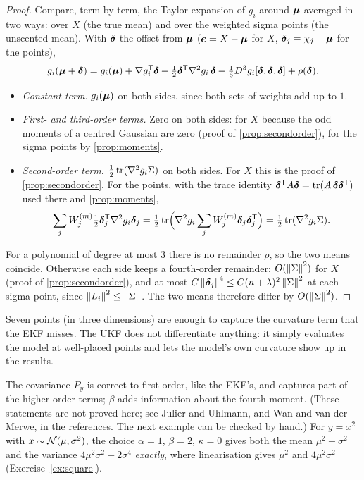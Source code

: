 \begin{proof}
Compare, term by term, the Taylor expansion of $g_i$ around $\bm{\mu}$
averaged in two ways: over $X$ (the true mean) and over the weighted
sigma points (the unscented mean). With $\bm{\delta}$ the offset from
$\bm{\mu}$ ($\bm{e}=X-\bm{\mu}$ for $X$, $\bm{\delta}_j=\chi_j-\bm{\mu}$ for the
points),
\[
  g_i(\bm{\mu}+\bm{\delta})=g_i(\bm{\mu})+\nabla g_i^{\mathsf{T}}\bm{\delta}
  +\tfrac12\bm{\delta}^{\mathsf{T}}\nabla^2g_i\,\bm{\delta}
  +\tfrac16D^3g_i[\bm{\delta},\bm{\delta},\bm{\delta}]+\rho(\bm{\delta}).
\]
\begin{itemize}[nosep]
  \item \emph{Constant term.} $g_i(\bm{\mu})$ on both sides, since both sets of
        weights add up to $1$.
  \item \emph{First- and third-order terms.} Zero on both sides: for $X$
        because the odd moments of a centred Gaussian are zero (proof of
        \cref{prop:secondorder}), for the sigma points by
        \cref{prop:moments}.
  \item \emph{Second-order term.} $\tfrac12\operatorname{tr}(\nabla^2g_i\Sigma)$ on both
        sides. For $X$ this is the proof of \cref{prop:secondorder}. For the points, with the trace identity
$\bm{\delta}^{\mathsf{T}} A\bm{\delta}=\operatorname{tr}(A\,\bm{\delta}\bm{\delta}^{\mathsf{T}})$ used there
and \cref{prop:moments},
        \[
          \sum_jW^{(m)}_j\tfrac12\bm{\delta}_j^{\mathsf{T}}\nabla^2g_i\bm{\delta}_j
          =\tfrac12\operatorname{tr}\Bigl(\nabla^2g_i\sum_jW^{(m)}_j\bm{\delta}_j
          \bm{\delta}_j^{\mathsf{T}}\Bigr)=\tfrac12\operatorname{tr}(\nabla^2g_i\Sigma).
        \]
\end{itemize}
For a polynomial of degree at most $3$ there is no remainder $\rho$, so
the two means coincide. Otherwise each side
keeps a fourth-order remainder: $O(\left\lVert \Sigma\right\rVert^2)$ for $X$ (proof of
\cref{prop:secondorder}), and at most $C\left\lVert \bm{\delta}_j\right\rVert^4\le
C(n+\lambda)^2\left\lVert \Sigma\right\rVert^2$ at each sigma point, since
$\left\lVert L_i\right\rVert^2\le\left\lVert \Sigma\right\rVert$. The two means therefore differ by
$O(\left\lVert \Sigma\right\rVert^2)$.
\end{proof}

\begin{inwords}
Seven points (in three dimensions) are enough to capture the curvature
term that the EKF misses. The UKF does not differentiate anything: it
simply evaluates the model at well-placed points and lets the model's own
curvature show up in the results.
\end{inwords}

The covariance $P_y$ is correct to first order, like the EKF's, and
captures part of the higher-order terms; $\beta$ adds information about
the fourth moment. (These statements are not proved here; see Julier and
Uhlmann, and Wan and van der Merwe, in the references. The next example
can be checked by hand.) For $y=x^2$ with $x\sim\mathcal{N}(\mu,\sigma^2)$, the
choice $\alpha=1$, $\beta=2$, $\kappa=0$ gives both the mean
$\mu^2+\sigma^2$ and the variance $4\mu^2\sigma^2+2\sigma^4$
\emph{exactly}, where linearisation gives $\mu^2$ and $4\mu^2\sigma^2$
(Exercise~\ref{ex:square}).

